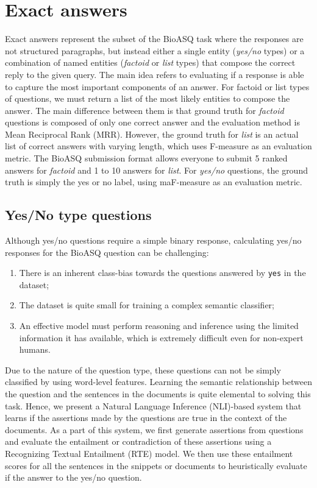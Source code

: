\documentclass[11pt,a4paper]{article}
\begin{document}
\section{Exact answers}
\label{approach2}
Exact answers represent the subset of the BioASQ task where the responses are not structured paragraphs, but instead either a single entity (\textit{yes/no} types) or a combination of named entities (\textit{factoid} or \textit{list} types) that compose the correct reply to the given query. The main idea refers to evaluating if a response is able to capture the most important components of an answer. For factoid or list types of questions, we must return a list of the most likely entities to compose the answer. The main difference between them is that ground truth for \textit{factoid} questions is composed of only one correct answer and the evaluation method is Mean Reciprocal Rank (MRR). However, the ground truth for \textit{list} is an actual list of correct answers with varying length, which uses F-measure as an evaluation metric. The BioASQ submission format allows everyone to submit 5 ranked answers for \textit{factoid} and 1 to 10 answers for \textit{list}. For \textit{yes/no} questions, the ground truth is simply the yes or no label, using maF-measure as an evaluation metric.


\subsection{Yes/No type questions}

Although yes/no questions require a simple binary response, calculating yes/no responses for the BioASQ question can be challenging: 
\begin{enumerate}
    \item There is an inherent class-bias towards the questions answered by \texttt{yes} in the dataset;
    \item The dataset is quite small for training a complex semantic classifier;
    \item An effective model must perform  reasoning and inference using the limited information it has available, which is extremely difficult even for non-expert humans.
\end{enumerate}

Due to the nature of the question type, these questions can not be simply classified by using word-level features. Learning the semantic relationship between the question and the sentences in the documents is quite elemental to solving this task. Hence, we present a Natural Language Inference (NLI)-based system that learns if the assertions made by the questions are true in the context of the documents. As a part of this system, we first generate assertions from questions and evaluate the entailment or contradiction of these assertions using a Recognizing Textual Entailment (RTE) model. We then use these entailment scores for all the sentences in the snippets or documents to heuristically evaluate if the answer to the yes/no question.
\end{document}
